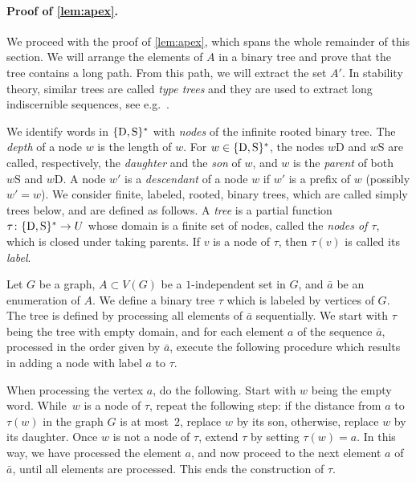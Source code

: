 \paragraph*{Proof of \cref{lem:apex}.} We proceed with the proof of \cref{lem:apex}, which spans the whole remainder of this section.
We will arrange the elements of $A$ in a binary tree
and prove that the tree contains a long path. From this path, we will 
extract the set $A'$. In stability theory, similar trees are called \emph{type trees} and they are used to extract long indiscernible sequences, see e.g.~\cite{malliaris2014regularity}. 


\newcommand{\dau}{\mathrm{D}}
\newcommand{\son}{\mathrm{S}}
	
	We identify words in $\set{\dau,\son}^*$ with \emph{nodes}
	of the infinite rooted binary tree. 
  The \emph{depth} of a node $w$ is the length of $w$.
  For $w\in \set{\dau,\son}^*$,
	 the nodes $w\dau$ and $w\son$ are called, respectively, the \emph{daughter} and the \emph{son} of $w$,
	and $w$ is the \emph{parent} of both $w\son$ and $w\dau$. A node $w'$ is a {\em{descendant}} of a node $w$ if $w'$ is a prefix of $w$ (possibly $w'=w$).
	We consider
	 finite, labeled, rooted, binary trees, which are called simply trees below, and are defined as follows.
	 A \emph{tree} is a partial function $\tau\from \set{\dau,\son}^*\to U$ whose domain is a finite set of nodes, called the \emph{nodes of $\tau$}, which is closed under taking parents. If $v$ is a node of $\tau$, then $\tau(v)$ is called its \emph{label}.
  
  Let $G$ be a graph, $A\subset V(G)$ be a $1$-independent set in $G$,
  and $\bar a$ be an enumeration of $A$.
We define  a binary tree $\tau$ which is 
  labeled by vertices of $G$. The tree is defined by processing all elements of $\bar a$ sequentially. We start with $\tau$ being the  tree with empty domain, and for each element $a$ of the sequence $\bar a$, processed in the order given by $\bar a$, execute the following procedure which results in adding a node with label $a$ to $\tau$.
  
When processing the vertex $a$, do the following. Start with $w$ being the empty word. While~$w$ is a node of $\tau$, repeat the following step: 
  if the distance from $a$ to $\tau(w)$ in the graph 
  $G$ is at most~$2$, replace $w$ by its son, otherwise, replace $w$ by its daughter.
  Once $w$ is not a node of $\tau$, extend $\tau$ by setting  $\tau(w)=a$. In this way, we have processed the element $a$, and now
    proceed to the next element $a$ of $\bar a$, until all elements are processed. This ends the construction of $\tau$.
	

